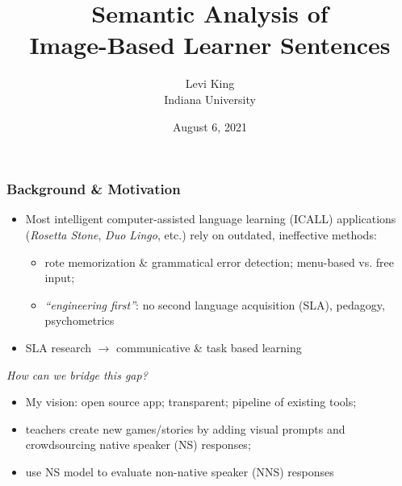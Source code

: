 \documentclass[xcolor={dvipsnames}]{beamer}
\title{Semantic Analysis of \\ Image-Based Learner Sentences}
\author[Levi King]{Levi King\\
Indiana University  }
\date{August 6, 2021}
\begin{document}
\maketitle
\begin{frame}
\frametitle{Background \& Motivation}
\begin{itemize}
\pause
\item Most intelligent computer-assisted language learning (ICALL) applications (\textit{Rosetta Stone}, \textit{Duo Lingo}, etc.) rely on outdated, ineffective methods:
\begin{itemize}
\pause
\item rote memorization \& grammatical error detection; menu-based vs. free input;
\pause
\item \textit{``engineering first''}: no second language acquisition (SLA), pedagogy, psychometrics
\end{itemize}
\pause
\item  SLA research $\rightarrow$ communicative \& task based learning
\end{itemize}

\small
\pause
\textit{How can we bridge this gap?}

\begin{itemize}
\pause
\item My vision: \pause open source app; transparent; pipeline of existing tools;
\pause
\item teachers create new games/stories by adding visual prompts and crowdsourcing native speaker (NS) responses;
\pause
\item use NS model to evaluate non-native speaker (NNS) responses
\end{itemize}
\end{frame}
\end{document}
